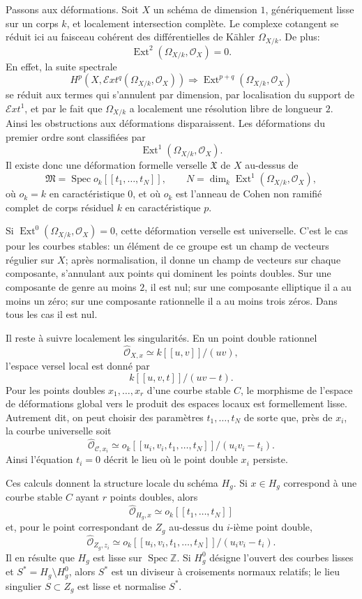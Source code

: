 \documentclass[11pt]{article}
\DeclareMathOperator{\Spec}{Spec}
\DeclareMathOperator{\Ext}{Ext}
\theoremstyle{plain}
\theoremstyle{definition}
\theoremstyle{remark}
\begin{document}
Passons aux déformations. Soit \(X\) un schéma de dimension \(1\), génériquement lisse sur un corps \(k\), et localement intersection complète. Le complexe cotangent se réduit ici au faisceau cohérent des différentielles de Kähler \(\Omega_{X/k}\). De plus:
\[
 \Ext^2(\Omega_{X/k},\mathcal O_X)=0.
\]
En effet, la suite spectrale
\[
 H^p(X,\mathcal Ext^q(\Omega_{X/k},\mathcal O_X))
 \Rightarrow \Ext^{p+q}(\Omega_{X/k},\mathcal O_X)
\]
se réduit aux termes qui s'annulent par dimension, par localisation du support de \(\mathcal Ext^1\), et par le fait que \(\Omega_{X/k}\) a localement une résolution libre de longueur \(2\). Ainsi les obstructions aux déformations disparaissent. Les déformations du premier ordre sont classifiées par
\[
 \Ext^1(\Omega_{X/k},\mathcal O_X).
\]
Il existe donc une déformation formelle verselle \(\mathfrak X\) de \(X\) au-dessus de
\[
 \mathfrak M=\Spec o_k[[t_1,\ldots,t_N]],
 \qquad
 N=\dim_k\Ext^1(\Omega_{X/k},\mathcal O_X),
\]
où \(o_k=k\) en caractéristique \(0\), et où \(o_k\) est l'anneau de Cohen non ramifié complet de corps résiduel \(k\) en caractéristique \(p\).

Si \(\Ext^0(\Omega_{X/k},\mathcal O_X)=0\), cette déformation verselle est universelle. C'est le cas pour les courbes stables: un élément de ce groupe est un champ de vecteurs régulier sur \(X\); après normalisation, il donne un champ de vecteurs sur chaque composante, s'annulant aux points qui dominent les points doubles. Sur une composante de genre au moins \(2\), il est nul; sur une composante elliptique il a au moins un zéro; sur une composante rationnelle il a au moins trois zéros. Dans tous les cas il est nul.

Il reste à suivre localement les singularités. En un point double rationnel
\[
 \widehat{\mathcal O}_{X,x}\simeq k[[u,v]]/(uv),
\]
l'espace versel local est donné par
\[
 k[[u,v,t]]/(uv-t).
\]
Pour les points doubles \(x_1,\ldots,x_r\) d'une courbe stable \(C\), le morphisme de l'espace de déformations global vers le produit des espaces locaux est formellement lisse. Autrement dit, on peut choisir des paramètres \(t_1,\ldots,t_N\) de sorte que, près de \(x_i\), la courbe universelle soit
\[
 \widehat{\mathcal O}_{\mathcal C,x_i}
 \simeq o_k[[u_i,v_i,t_1,\ldots,t_N]]/(u_iv_i-t_i).
\]
Ainsi l'équation \(t_i=0\) décrit le lieu où le point double \(x_i\) persiste.

Ces calculs donnent la structure locale du schéma \(H_g\). Si \(x\in H_g\) correspond à une courbe stable \(C\) ayant \(r\) points doubles, alors
\[
 \widehat{\mathcal O}_{H_g,x}\simeq o_k[[t_1,\ldots,t_N]]
\]
et, pour le point correspondant de \(Z_g\) au-dessus du \(i\)-ième point double,
\[
 \widehat{\mathcal O}_{Z_g,z_i}
 \simeq o_k[[u_i,v_i,t_1,\ldots,t_N]]/(u_iv_i-t_i).
\]
Il en résulte que \(H_g\) est lisse sur \(\Spec\mathbb Z\). Si \(H_g^0\) désigne l'ouvert des courbes lisses et \(S^*=H_g\setminus H_g^0\), alors \(S^*\) est un diviseur à croisements normaux relatifs; le lieu singulier \(S\subset Z_g\) est lisse et normalise \(S^*\).
\end{document}
